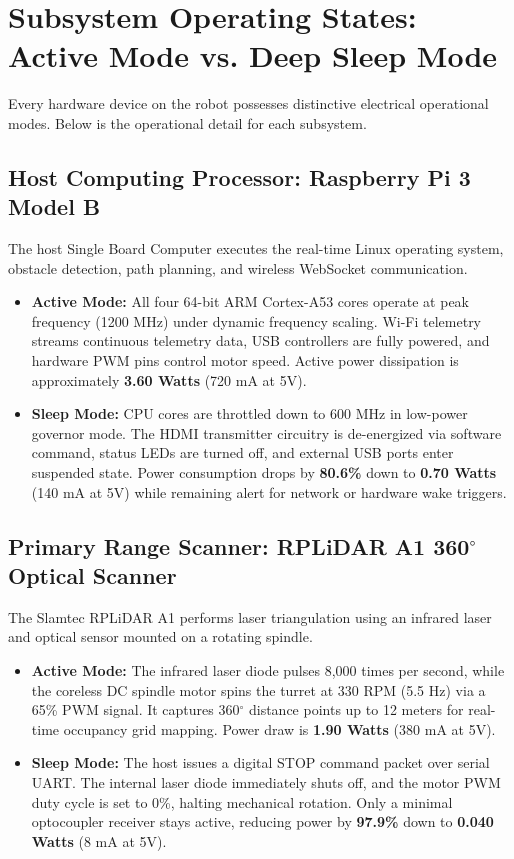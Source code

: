 \documentclass[11pt,a4paper]{article}
\begin{document}
\newpage

\section{Subsystem Operating States: Active Mode vs. Deep Sleep Mode}

Every hardware device on the robot possesses distinctive electrical operational modes. Below is the operational detail for each subsystem.

\subsection{Host Computing Processor: Raspberry Pi 3 Model B}
The host Single Board Computer executes the real-time Linux operating system, obstacle detection, path planning, and wireless WebSocket communication.
\begin{itemize}
    \item \textbf{Active Mode:} All four 64-bit ARM Cortex-A53 cores operate at peak frequency (1200 MHz) under dynamic frequency scaling. Wi-Fi telemetry streams continuous telemetry data, USB controllers are fully powered, and hardware PWM pins control motor speed. Active power dissipation is approximately \textbf{3.60 Watts} (720 mA at 5V).
    \item \textbf{Sleep Mode:} CPU cores are throttled down to 600 MHz in low-power governor mode. The HDMI transmitter circuitry is de-energized via software command, status LEDs are turned off, and external USB ports enter suspended state. Power consumption drops by \textbf{80.6\%} down to \textbf{0.70 Watts} (140 mA at 5V) while remaining alert for network or hardware wake triggers.
\end{itemize}

\subsection{Primary Range Scanner: RPLiDAR A1 360$^\circ$ Optical Scanner}
The Slamtec RPLiDAR A1 performs laser triangulation using an infrared laser and optical sensor mounted on a rotating spindle.
\begin{itemize}
    \item \textbf{Active Mode:} The infrared laser diode pulses 8,000 times per second, while the coreless DC spindle motor spins the turret at 330 RPM (5.5 Hz) via a 65\% PWM signal. It captures 360$^\circ$ distance points up to 12 meters for real-time occupancy grid mapping. Power draw is \textbf{1.90 Watts} (380 mA at 5V).
    \item \textbf{Sleep Mode:} The host issues a digital STOP command packet over serial UART. The internal laser diode immediately shuts off, and the motor PWM duty cycle is set to 0\%, halting mechanical rotation. Only a minimal optocoupler receiver stays active, reducing power by \textbf{97.9\%} down to \textbf{0.040 Watts} (8 mA at 5V).
\end{itemize}
\end{document}
